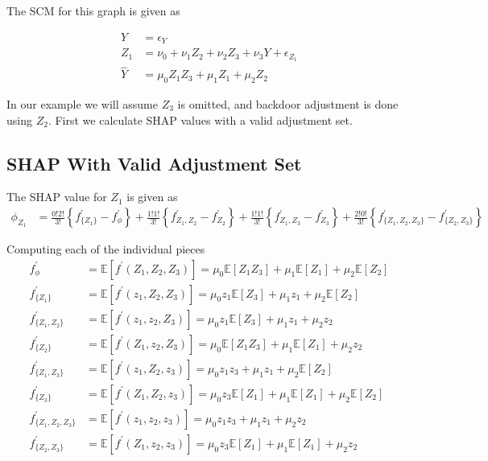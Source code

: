 \documentclass{article}
\begin{document}
The SCM for this graph is given as 

\begin{align*}
Y &= \epsilon_Y\\
Z_1 &= \nu_0 + \nu_{1}Z_2 + \nu_{2} Z_3 + \nu_{3} Y + \epsilon_{Z_1}\\
\hat{Y} &= \mu_0Z{_1}Z{_3} + \mu_1Z_1 + \mu_2Z_2 
\end{align*}

In our example we will assume $Z_3$ is omitted, and backdoor adjustment is done using $Z_2$. First we calculate SHAP values with a valid adjustment set.
\subsection{SHAP With Valid Adjustment Set}

The SHAP value for $Z_1$ is given as 
\begin{align*}
\phi_{Z_1} &= \frac{0!2!}{3!}\left\{f^\prime_{\{Z_1\}} - f^\prime_{\phi} \right\} + \frac{1!1!}{3!}\left\{f^\prime_{Z_1, Z_2} - f^\prime_{Z_2} \right\} + \frac{1!1!}{3!}\left\{f^\prime_{Z_1, Z_3} - f^\prime_{Z_3} \right\} + \frac{2!0!}{3!}\left\{f^\prime_{\{Z_1, Z_2, Z_3 \}} - f^\prime_{\{Z_2, Z_3 \}}\right\}
\end{align*}

Computing each of the individual pieces
\begin{align*}
f^\prime_{\phi} &= \mathbb{E}[f^\prime(Z_1, Z_2, Z_3)] = \mu_0 \mathbb{E}[Z_1Z_3] + \mu_1\mathbb{E}[Z_1] + \mu_2\mathbb{E}[Z_2]\\
f^\prime_{\{Z_1\}} &= \mathbb{E}[f^\prime(z_1, Z_2, Z_3)] = \mu_0 z_1 \mathbb{E}[Z_3] + \mu_1z_1 + \mu_2\mathbb{E}[Z_2]\\
f^\prime_{\{Z_1, Z_2\}} &= \mathbb{E}[f^\prime(z_1, z_2, Z_3)] = \mu_0 z_1 \mathbb{E}[Z_3] + \mu_1z_1 + \mu_2 z_2\\
f^\prime_{\{Z_2\}} &= \mathbb{E}[f^\prime(Z_1, z_2, Z_3)] = \mu_0 \mathbb{E}[Z_1Z_3] + \mu_1\mathbb{E}[Z_1] + \mu_2 z_2\\
f^\prime_{\{Z_1, Z_3\}} &= \mathbb{E}[f^\prime(z_1, Z_2, z_3)] = \mu_0 z_1 z_3 + \mu_1z_1 + \mu_2 \mathbb{E}[Z_2]\\
f^\prime_{\{Z_3\}} &= \mathbb{E}[f^\prime(Z_1, Z_2, z_3)] = \mu_0 z_3\mathbb{E}[Z_1] + \mu_1\mathbb{E}[Z_1] + \mu_2 \mathbb{E}[Z_2]\\
f^\prime_{\{Z_1, Z_2, Z_3\}} &= \mathbb{E}[f^\prime(z_1, z_2, z_3)] = \mu_0 z_1 z_3 + \mu_1z_1 + \mu_2 z_2\\
f^\prime_{\{Z_2, Z_3\}} &= \mathbb{E}[f^\prime(Z_1, z_2, z_3)] = \mu_0 z_3\mathbb{E}[Z_1] + \mu_1\mathbb{E}[Z_1] + \mu_2 z_2\\
\end{align*}
\end{document}
